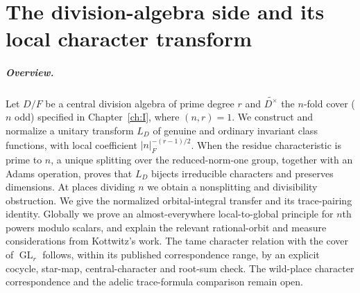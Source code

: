 \begingroup
\providecommand{\A}{}\renewcommand{\A}{\mathbb A}
\providecommand{\C}{}\renewcommand{\C}{\mathbb C}
\providecommand{\Z}{}\renewcommand{\Z}{\mathbb Z}
\providecommand{\GL}{}\renewcommand{\GL}{\operatorname{GL}}
\providecommand{\Nrd}{}\renewcommand{\Nrd}{\operatorname{Nrd}}
\providecommand{\Irr}{}\renewcommand{\Irr}{\operatorname{Irr}}
\providecommand{\vol}{}\renewcommand{\vol}{\operatorname{vol}}
\providecommand{\tH}{}\renewcommand{\tH}{\widetilde H}
\providecommand{\tZ}{}\renewcommand{\tZ}{\widetilde Z}
\providecommand{\ttT}{}\renewcommand{\ttT}{\widetilde T}
\providecommand{\reg}{}\renewcommand{\reg}{\mathrm{reg}}
\providecommand{\gen}{}\renewcommand{\gen}{\mathrm{gen}}
\providecommand{\JL}{}\renewcommand{\JL}{\mathrm{JL}}
\providecommand{\Sha}{}\renewcommand{\Sha}{\operatorname{Sha}}
\providecommand{\Gb}{}\renewcommand{\Gb}{\overline{G}}
\providecommand{\GDb}{}\renewcommand{\GDb}{\overline{G}_D}
\providecommand{\Zb}{}\renewcommand{\Zb}{\overline{Z}}
\providecommand{\Ptag}{}\renewcommand{\Ptag}{\textnormal{\textbf{(P)}}}
\providecommand{\Etag}{}\renewcommand{\Etag}{\textnormal{\textbf{(E)}}}
\providecommand{\Otag}{}\renewcommand{\Otag}{\textnormal{\textbf{(O)}}}
\providecommand{\Ctag}{}\renewcommand{\Ctag}{\textnormal{\textbf{(C)}}}
\chapter[The division-algebra side]{The division-algebra side and its local character transform}\label{ch:III}
\paragraph{Overview.} Let $D/F$ be a central division algebra of prime degree $r$ and
$\widetilde{D^\times}$ the $n$-fold cover ($n$ odd) specified in
Chapter~\ref{ch:I}, where $(n,r)=1$. We construct and normalize a unitary
transform $L_D$ of genuine and ordinary invariant class functions,
with local coefficient $|n|_F^{-(r-1)/2}$. When the residue characteristic
is prime to $n$, a unique splitting over the reduced-norm-one group,
together with an Adams operation, proves that $L_D$ bijects irreducible
characters and preserves dimensions. At places dividing $n$ we obtain
a nonsplitting and divisibility obstruction. We give the normalized
orbital-integral transfer and its trace-pairing identity. Globally we
prove an almost-everywhere local-to-global principle for $n$th powers
modulo scalars, and explain the relevant rational-orbit and measure
considerations from Kottwitz's work. The tame character relation with the cover of $\GL_r$ follows, within
its published correspondence range, by an explicit cocycle, star-map,
central-character and root-sum check. The wild-place character
correspondence and the adelic trace-formula comparison remain open.

